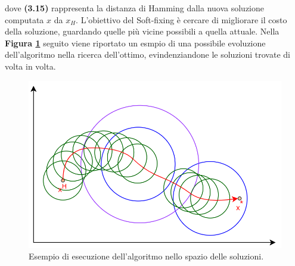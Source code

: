 dove \textbf{(3.15)} rappresenta la distanza di Hamming dalla nuova soluzione computata $x$ da $x_H$. L'obiettivo del Soft-fixing è cercare di migliorare il costo della soluzione, guardando quelle più vicine possibili a quella attuale. Nella \textbf{Figura \ref{local_exe}} seguito viene riportato un esmpio di una possibile evoluzione dell'algoritmo nella ricerca dell'ottimo, evindenziandone le soluzioni trovate di volta in volta.
\begin{figure}[h] 
\begin{center} 
  \includegraphics[scale=0.38]{Images/local_exe}
  \caption{\footnotesize{Esempio di esecuzione dell'algoritmo nello spazio delle soluzioni.}} \label{local_exe} 
\end{center} 
\end{figure}
